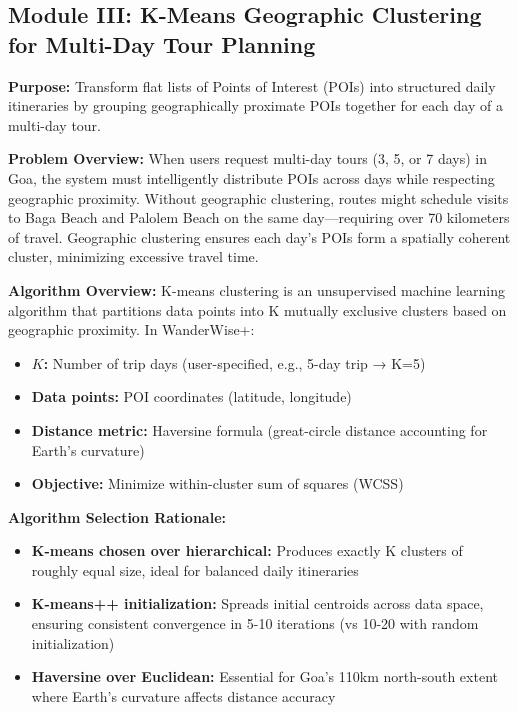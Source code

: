 \subsection{Module III: K-Means Geographic Clustering for Multi-Day Tour Planning}

\textbf{Purpose:} Transform flat lists of Points of Interest (POIs) into structured daily itineraries by grouping geographically proximate POIs together for each day of a multi-day tour.

\textbf{Problem Overview:}
When users request multi-day tours (3, 5, or 7 days) in Goa, the system must intelligently distribute POIs across days while respecting geographic proximity. Without geographic clustering, routes might schedule visits to Baga Beach and Palolem Beach on the same day—requiring over 70 kilometers of travel. Geographic clustering ensures each day's POIs form a spatially coherent cluster, minimizing excessive travel time.

\textbf{Algorithm Overview:}
K-means clustering is an unsupervised machine learning algorithm that partitions data points into K mutually exclusive clusters based on geographic proximity. In WanderWise+:
\begin{itemize}
    \item \textbf{$K$:} Number of trip days (user-specified, e.g., 5-day trip → K=5)
    \item \textbf{Data points:} POI coordinates (latitude, longitude)
    \item \textbf{Distance metric:} Haversine formula (great-circle distance accounting for Earth's curvature)
    \item \textbf{Objective:} Minimize within-cluster sum of squares (WCSS)
\end{itemize}

\textbf{Algorithm Selection Rationale:}
\begin{itemize}
    \item \textbf{K-means chosen over hierarchical:} Produces exactly K clusters of roughly equal size, ideal for balanced daily itineraries
    \item \textbf{K-means++ initialization:} Spreads initial centroids across data space, ensuring consistent convergence in 5-10 iterations (vs 10-20 with random initialization)
    \item \textbf{Haversine over Euclidean:} Essential for Goa's 110km north-south extent where Earth's curvature affects distance accuracy
\end{itemize}

